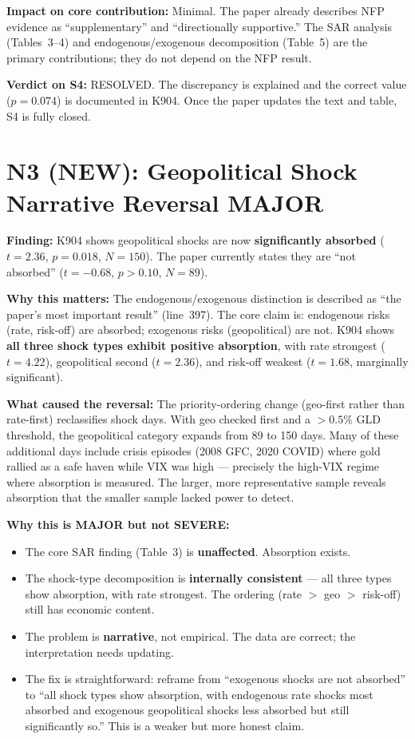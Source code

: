 \documentclass[12pt,a4paper]{article}
\begin{document}
\noindent\textbf{Impact on core contribution:} Minimal.
The paper already describes NFP evidence as ``supplementary'' and ``directionally supportive.''
The SAR analysis (Tables~3--4) and endogenous/exogenous decomposition (Table~5) are the primary contributions; they do not depend on the NFP result.

\medskip

\noindent\textbf{Verdict on S4:} \textcolor{okgreen}{RESOLVED.}
The discrepancy is explained and the correct value ($p = 0.074$) is documented in K904.
Once the paper updates the text and table, S4 is fully closed.

\bigskip

\section*{N3 (NEW): Geopolitical Shock Narrative Reversal \hfill \textcolor{warncolor}{MAJOR}}

\textbf{Finding:} K904 shows geopolitical shocks are now \textbf{significantly absorbed} ($t = 2.36$, $p = 0.018$, $N = 150$).
The paper currently states they are ``not absorbed'' ($t = -0.68$, $p > 0.10$, $N = 89$).

\textbf{Why this matters:}
The endogenous/exogenous distinction is described as ``the paper's most important result'' (line~397).
The core claim is: endogenous risks (rate, risk-off) are absorbed; exogenous risks (geopolitical) are not.
K904 shows \textbf{all three shock types exhibit positive absorption}, with rate strongest ($t = 4.22$), geopolitical second ($t = 2.36$), and risk-off weakest ($t = 1.68$, marginally significant).

\textbf{What caused the reversal:}
The priority-ordering change (geo-first rather than rate-first) reclassifies shock days.
With geo checked first and a $>0.5\%$ GLD threshold, the geopolitical category expands from 89 to 150 days.
Many of these additional days include crisis episodes (2008 GFC, 2020 COVID) where gold rallied as a safe haven while VIX was high --- precisely the high-VIX regime where absorption is measured.
The larger, more representative sample reveals absorption that the smaller sample lacked power to detect.

\textbf{Why this is MAJOR but not SEVERE:}
\begin{itemize}[nosep]
\item The core SAR finding (Table~3) is \textbf{unaffected}. Absorption exists.
\item The shock-type decomposition is \textbf{internally consistent} --- all three types show absorption, with rate strongest. The ordering (rate $>$ geo $>$ risk-off) still has economic content.
\item The problem is \textbf{narrative}, not empirical. The data are correct; the interpretation needs updating.
\item The fix is straightforward: reframe from ``exogenous shocks are not absorbed'' to ``all shock types show absorption, with endogenous rate shocks most absorbed and exogenous geopolitical shocks less absorbed but still significantly so.'' This is a weaker but more honest claim.
\end{itemize}
\end{document}
